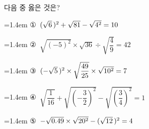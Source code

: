 다음 중 옳은 것은?
\par\medskip\par\noindent\hangindent=1.4em {\small ①}\ $(\sqrt{6}\mkern3mu )^2+\sqrt{81}-\sqrt{4^2}=10$\par\noindent\hangindent=1.4em {\small ②}\ $\sqrt{(-5)^2}\times\sqrt{36}\div\sqrt{\dfrac{4}{9}}=42$\par\noindent\hangindent=1.4em {\small ③}\ $(-\sqrt{5}\mkern3mu )^2\times\sqrt{\dfrac{49}{25}}\times\sqrt{10^2}=7$\par\noindent\hangindent=1.4em {\small ④}\ $\sqrt{\dfrac{1}{16}}+\sqrt{\left(-\dfrac{3}{2}\right)^2}-\sqrt{\left(\dfrac{3}{4}\right)^2}=1$\par\noindent\hangindent=1.4em {\small ⑤}\ $-\sqrt{0.49}\times\sqrt{20^2}-(\sqrt{12}\mkern3mu )^2=4$\par\medskip

